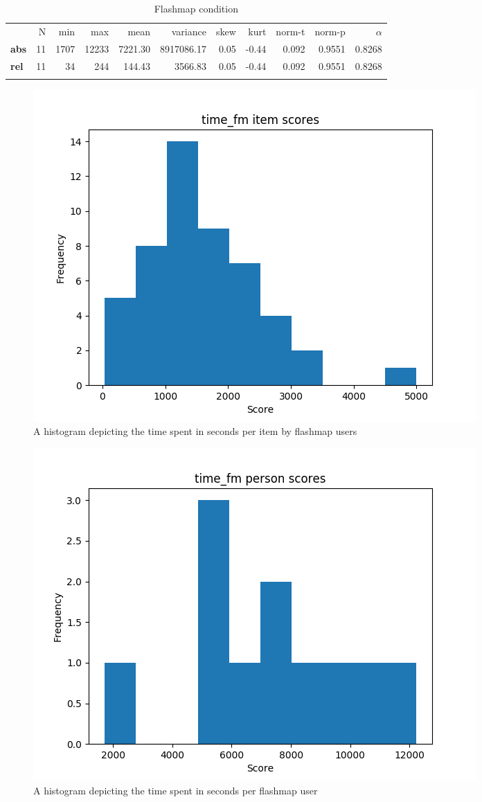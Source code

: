 \begin{longtable}[c]{@{}lrrrrrrrrrr@{}}
\caption{Flashmap condition}
\endfirsthead
\toprule\addlinespace
& N & min & max & mean & variance & skew & kurt & norm-t &
norm-p & $\alpha$
\\\addlinespace
\midrule
\textbf{abs} & 11 & 1707 & 12233 & 7221.30 & 8917086.17 & 0.05 & -0.44 &
0.092 & 0.9551 & 0.8268
\\\addlinespace
\textbf{rel} & 11 & 34 & 244 & 144.43 & 3566.83 & 0.05 & -0.44 & 0.092 &
0.9551 & 0.8268
\\\addlinespace
\bottomrule
    \label{tab:time_fm}
\end{longtable}

\begin{figure}
    \centering
    \includegraphics[width=.7\textwidth]{img/time_fm_diff.png}
    \caption{A histogram depicting the time spent in seconds per item by flashmap users} 
    \label{fig:time_fm_diff}
\end{figure}
\begin{figure}
    \centering
    \includegraphics[width=.7\textwidth]{img/time_fm_abil.png}
    \caption{A histogram depicting the time spent in seconds per flashmap user}
    \label{fig:time_fm_abil}
\end{figure}

